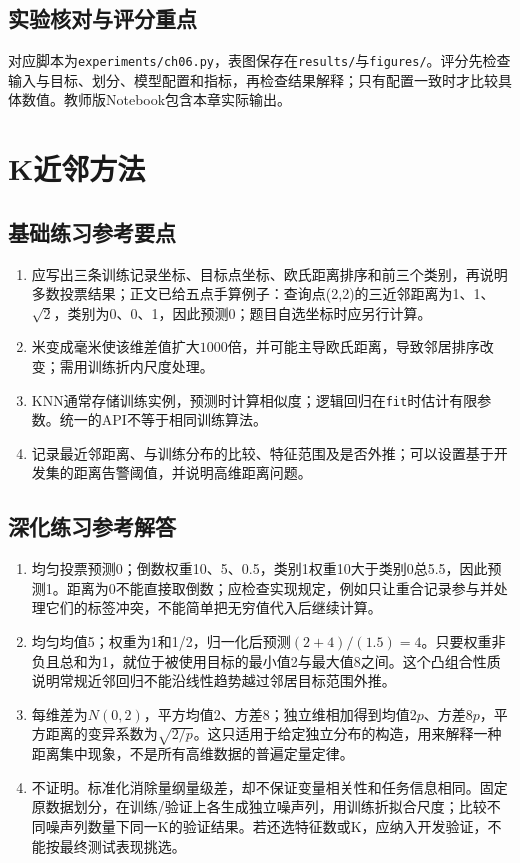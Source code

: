 \section*{实验核对与评分重点}
对应脚本为\texttt{experiments/ch06.py}，表图保存在\texttt{results/}与\texttt{figures/}。评分先检查输入与目标、划分、模型配置和指标，再检查结果解释；只有配置一致时才比较具体数值。教师版Notebook包含本章实际输出。

\chapter{K近邻方法}
\section*{基础练习参考要点}
\begin{enumerate}[label=\arabic*.]
\item 应写出三条训练记录坐标、目标点坐标、欧氏距离排序和前三个类别，再说明多数投票结果；正文已给五点手算例子：查询点(2,2)的三近邻距离为1、1、$\sqrt2$，类别为0、0、1，因此预测0；题目自选坐标时应另行计算。
\item 米变成毫米使该维差值扩大$1000$倍，并可能主导欧氏距离，导致邻居排序改变；需用训练折内尺度处理。
\item KNN通常存储训练实例，预测时计算相似度；逻辑回归在\texttt{fit}时估计有限参数。统一的API不等于相同训练算法。
\item 记录最近邻距离、与训练分布的比较、特征范围及是否外推；可以设置基于开发集的距离告警阈值，并说明高维距离问题。
\end{enumerate}
\section*{深化练习参考解答}
\begin{enumerate}[label=D\arabic*.]
\item 均匀投票预测0；倒数权重10、5、0.5，类别1权重10大于类别0总5.5，因此预测1。距离为0不能直接取倒数；应检查实现规定，例如只让重合记录参与并处理它们的标签冲突，不能简单把无穷值代入后继续计算。
\item 均匀均值5；权重为1和1/2，归一化后预测$(2+4)/(1.5)=4$。只要权重非负且总和为1，就位于被使用目标的最小值2与最大值8之间。这个凸组合性质说明常规近邻回归不能沿线性趋势越过邻居目标范围外推。
\item 每维差为$N(0,2)$，平方均值2、方差8；独立维相加得到均值$2p$、方差$8p$，平方距离的变异系数为$\sqrt{2/p}$。这只适用于给定独立分布的构造，用来解释一种距离集中现象，不是所有高维数据的普遍定量定律。
\item 不证明。标准化消除量纲量级差，却不保证变量相关性和任务信息相同。固定原数据划分，在训练/验证上各生成独立噪声列，用训练折拟合尺度；比较不同噪声列数量下同一K的验证结果。若还选特征数或K，应纳入开发验证，不能按最终测试表现挑选。
\end{enumerate}

